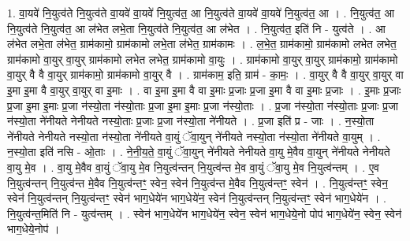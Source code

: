 \documentclass[17pt]{extarticle}
\begin{document}
1. वा॒यवे॑ नि॒युत्व॑ते नि॒युत्व॑ते वा॒यवे॑ वा॒यवे॑ नि॒युत्व॑त॒ आ नि॒युत्व॑ते वा॒यवे॑ वा॒यवे॑ नि॒युत्व॑त॒ आ । . नि॒युत्व॑त॒ आ नि॒युत्व॑ते नि॒युत्व॑त॒ आ ल॑भेत लभे॒ता नि॒युत्व॑ते नि॒युत्व॑त॒ आ ल॑भेत । . नि॒युत्व॑त॒ इति॑ नि - युत्व॑ते । . आ ल॑भेत लभे॒ता ल॑भेत॒ ग्राम॑कामो॒ ग्राम॑कामो लभे॒ता ल॑भेत॒ ग्राम॑कामः । . ल॒भे॒त॒ ग्राम॑कामो॒ ग्राम॑कामो लभेत लभेत॒ ग्राम॑कामो वा॒युर् वा॒युर् ग्राम॑कामो लभेत लभेत॒ ग्राम॑कामो वा॒युः । . ग्राम॑कामो वा॒युर् वा॒युर् ग्राम॑कामो॒ ग्राम॑कामो वा॒युर् वै वै वा॒युर् ग्राम॑कामो॒ ग्राम॑कामो वा॒युर् वै । . ग्राम॑काम॒ इति॒ ग्राम॑ - का॒मः॒ । . वा॒युर् वै वै वा॒युर् वा॒युर् वा इ॒मा इ॒मा वै वा॒युर् वा॒युर् वा इ॒माः । . वा इ॒मा इ॒मा वै वा इ॒माः प्र॒जाः प्र॒जा इ॒मा वै वा इ॒माः प्र॒जाः । . इ॒माः प्र॒जाः प्र॒जा इ॒मा इ॒माः प्र॒जा न॑स्यो॒ता न॑स्यो॒ताः प्र॒जा इ॒मा इ॒माः प्र॒जा न॑स्यो॒ताः । . प्र॒जा न॑स्यो॒ता न॑स्यो॒ताः प्र॒जाः प्र॒जा न॑स्यो॒ता ने॑नीयते नेनीयते नस्यो॒ताः प्र॒जाः प्र॒जा न॑स्यो॒ता ने॑नीयते । . प्र॒जा इति॑ प्र - जाः । . न॒स्यो॒ता ने॑नीयते नेनीयते नस्यो॒ता न॑स्यो॒ता ने॑नीयते वा॒युं ॅवा॒युन् ने॑नीयते नस्यो॒ता न॑स्यो॒ता ने॑नीयते वा॒युम् । . न॒स्यो॒ता इति॑ नसि - ओ॒ताः । . ने॒नी॒य॒ते॒ वा॒युं ॅवा॒युन् ने॑नीयते नेनीयते वा॒यु मे॒वैव वा॒युन् ने॑नीयते नेनीयते वा॒यु मे॒व । . वा॒यु मे॒वैव वा॒युं ॅवा॒यु मे॒व नि॒युत्व॑न्तन् नि॒युत्व॑न्त मे॒व वा॒युं ॅवा॒यु मे॒व नि॒युत्व॑न्तम् । . ए॒व नि॒युत्व॑न्तन् नि॒युत्व॑न्त मे॒वैव नि॒युत्व॑न्तꣳ॒॒ स्वेन॒ स्वेन॑ नि॒युत्व॑न्त मे॒वैव नि॒युत्व॑न्तꣳ॒॒ स्वेन॑ । . नि॒युत्व॑न्तꣳ॒॒ स्वेन॒ स्वेन॑ नि॒युत्व॑न्तन् नि॒युत्व॑न्तꣳ॒॒ स्वेन॑ भाग॒धेये॑न भाग॒धेये॑न॒ स्वेन॑ नि॒युत्व॑न्तन् नि॒युत्व॑न्तꣳ॒॒ स्वेन॑ भाग॒धेये॑न । . नि॒युत्व॑न्त॒मिति॑ नि - युत्व॑न्तम् । . स्वेन॑ भाग॒धेये॑न भाग॒धेये॑न॒ स्वेन॒ स्वेन॑ भाग॒धेये॒नो पोप॑ भाग॒धेये॑न॒ स्वेन॒ स्वेन॑ भाग॒धेये॒नोप॑ । \newline
\end{document}
